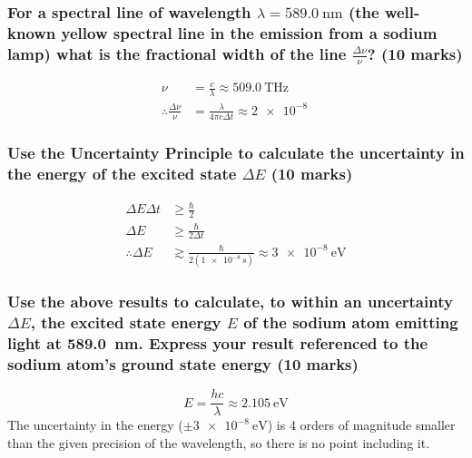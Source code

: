 \documentclass[a4paper]{scrartcl}
\begin{document}
\subsubsection{For a spectral line of wavelength \(\lambda = \SI{589.0}{\nano\metre}\) (the well-known yellow spectral line in the emission from a sodium lamp) what is the fractional width of the line \(\frac{\Delta \nu}{\nu}\)? (10 marks)}
\begin{align*}
    \nu &= \frac{c}{\lambda} \approx \SI{509.0}{\tera\hertz} \\
    \therefore \frac{\Delta \nu}{\nu} &= \frac{\lambda}{4 \pi c \Delta t} \approx \SI{2e-8}{}
\end{align*}

\subsubsection{Use the Uncertainty Principle to calculate the uncertainty in the energy of the excited state \(\Delta E\) (10 marks)}
\begin{align*}
    \Delta E \Delta t &\geq \frac{\hbar}{2} \\
    \Delta E &\geq \frac{\hbar}{2 \Delta t} \\
    \therefore \Delta E &\gtrsim \frac{\hbar}{2 (\SI{1e-8}{\second})} \approx \SI{3e-8}{\electronvolt}
\end{align*}

\subsubsection{Use the above results to calculate, to within an uncertainty \(\Delta E\), the excited state energy \(E\) of the sodium atom emitting light at \SI{589.0}{\nano\metre}. Express your result referenced to the sodium atom's ground state energy (10 marks)}
\[E = \frac{h c}{\lambda} \approx \SI{2.105}{\electronvolt}\]
The uncertainty in the energy (\(\pm\SI{3e-8}{\electronvolt}\)) is 4 orders of magnitude smaller than the given precision of the wavelength, so there is no point including it.
\end{document}
